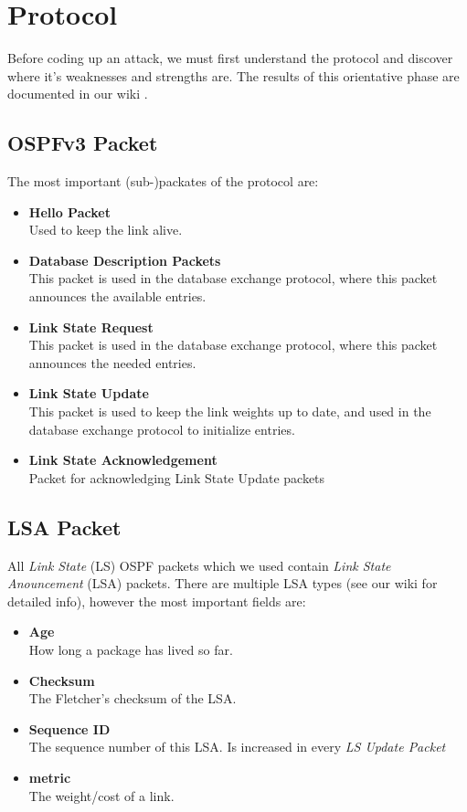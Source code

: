 \documentclass[11pt,a4paper,oneside]{article}
\newcommand{\lsection}[2]{\section{#1}\label{sec:#2}}
\newcommand{\lsubsection}[2]{\subsection{#1}\label{sec:#2}}
\begin{document}
    \lsection{Protocol}{protocol}
    Before coding up an attack, we must first understand the protocol and discover where it's weaknesses and strengths are. The results of this orientative phase are documented in our wiki \cite{wiki}.
    \lsubsection{OSPFv3 Packet}{ospfv3_packet}
    The most important (sub-)packates of the protocol are:
    \begin{itemize}
        \item \textbf{Hello Packet}\\
        Used to keep the link alive.
        \item \textbf{Database Description Packets}\\
        This packet is used in the database exchange protocol, where this packet announces the available entries.
        \item \textbf{Link State Request}\\
        This packet is used in the database exchange protocol, where this packet announces the needed entries.
        \item \textbf{Link State Update}\\
        This packet is used to keep the link weights up to date, and used in the database exchange protocol to initialize entries.
        \item \textbf{Link State Acknowledgement}\\
        Packet for acknowledging Link State Update packets
    \end{itemize}
    \lsubsection{LSA Packet}{lsa_packet}
    All \textit{Link State} (LS) OSPF packets which we used contain \textit{Link State Anouncement} (LSA) packets. There are multiple LSA types (see our wiki\cite{wiki} for detailed info), however the most important fields are:
    \begin{itemize}
        \item \textbf{Age}\\
        How long a package has lived so far.
        \item \textbf{Checksum}\\
        The Fletcher's checksum\cite{fletcher} of the LSA.
        \item \textbf{Sequence ID}\\
        The sequence number of this LSA. Is increased in every \textit{LS Update Packet}
        \item \textbf{metric}\\
        The weight/cost of a link.
    \end{itemize}
\end{document}
